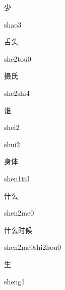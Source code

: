 \begin{multicols*}{2}
\begin{verbete}[shao3]{少}
\begin{pronuncia}{shao3}
\end{pronuncia}
\end{verbete}

\begin{verbete}{舌头}
\begin{pronuncia}{she2tou0}
\end{pronuncia}
\end{verbete}

\begin{verbete}{摄氏}
\begin{pronuncia}{she2shi4}
\end{pronuncia}
\end{verbete}

\begin{verbete}[shei2]{谁}
\begin{pronuncia}{shei2}
\end{pronuncia}
\begin{pronuncia}{shui2}
\end{pronuncia}
\end{verbete}

\begin{verbete}[shen1ti3]{身体}
\begin{pronuncia}{shen1ti3}
\end{pronuncia}
\end{verbete}

\begin{verbete}[shen2me0]{什么}
\begin{pronuncia}{shen2me0}
\end{pronuncia}
\end{verbete}

\begin{verbete}{什么时候}
\begin{pronuncia}{shen2me0shi2hou0}
\end{pronuncia}
\end{verbete}

\begin{verbete}[sheng1]{生}
\begin{pronuncia}{sheng1}
\end{pronuncia}
\end{verbete}


\end{multicols*}
